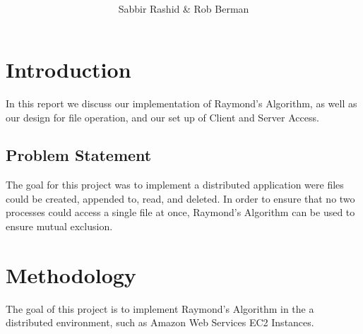\documentclass{article}
\title{
\textmd{\textbf{\ProjectTitle}}\\
\author{
	Sabbir Rashid \& Rob Berman\\
	\bf{\Institution}}
	\date{} %
}
\begin{document}

\setlength{\parindent}{8ex}

\tableofcontents
\newpage
\maketitle
\section{Introduction}
\label{sec:Introduction}
In this report we discuss our implementation of Raymond's Algorithm, as well as our design for file operation, and our set up of Client and Server Access.
	\subsection{Problem Statement}
	\label{subsec:ProblemStatement}
	The goal for this project was to implement a distributed application were files could be created, appended to, read, and deleted. In order to ensure that no two processes could access a single file at once, Raymond's Algorithm can be used to ensure mutual exclusion.

\section{Methodology}
The goal of this project is to implement Raymond's Algorithm in the a distributed environment, such as Amazon Web Services EC2 Instances. 
\end{document}
